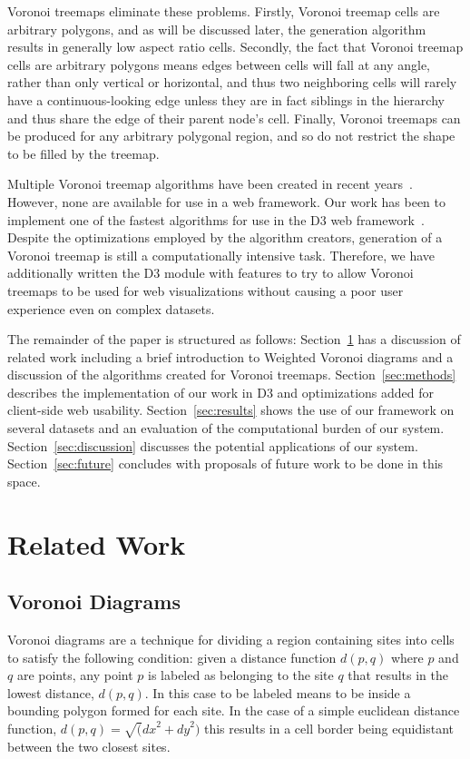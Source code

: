 \documentclass{acm_proc_article-sp}
\begin{document}
Voronoi treemaps eliminate these problems. Firstly, Voronoi treemap
cells are arbitrary polygons, and as will be discussed later, the
generation algorithm results in generally low aspect ratio
cells. Secondly, the fact that Voronoi treemap cells are arbitrary
polygons means edges between cells will fall at any angle, rather than
only vertical or horizontal, and thus two neighboring cells will
rarely have a continuous-looking edge unless they are in fact
siblings in the hierarchy and thus share the edge of their parent
node's cell. Finally, Voronoi treemaps can be produced for any
arbitrary polygonal region, and so do not restrict the shape to be
filled by the treemap.

Multiple Voronoi treemap algorithms have been created in recent 
years~\cite{balzer:treemaps, sud:fast, nocaj:faster}. However,
none are available for use in a web framework.  Our work has been to
implement one of the fastest algorithms for use in the D3 web
framework~\cite{cite D3}. Despite the optimizations employed by the algorithm
creators, generation of a Voronoi treemap is still a computationally
intensive task. Therefore, we have additionally written the D3 module
with features to try to allow Voronoi treemaps to be used for web
visualizations without causing a poor user experience even on complex
datasets.

The remainder of the paper is structured as follows: Section~\ref{sec:related} has a
discussion of related work including a brief introduction to Weighted
Voronoi diagrams and a discussion of the algorithms created for
Voronoi treemaps. Section~\ref{sec:methods} describes the implementation of our work
in D3 and optimizations added for client-side web usability. Section~\ref{sec:results}
shows the use of our framework on several datasets and an evaluation
of the computational burden of our system. Section~\ref{sec:discussion} discusses the
potential applications of our system. Section~\ref{sec:future} concludes with
proposals of future work to be done in this space.

\section{Related Work}
\label{sec:related}

\subsection{Voronoi Diagrams}
Voronoi diagrams are a technique for dividing a region containing
sites into cells to satisfy the following condition: given a distance
function $d(p, q)$ where $p$ and $q$ are points, any point $p$ is
labeled as belonging to the site $q$ that results in the lowest
distance, $d(p,q)$. In this case to be labeled means to be inside a
bounding polygon formed for each site. In the case of a simple
euclidean distance function, $d(p,q) = \sqrt({dx}^2 + {dy}^2)$ this
results in a cell border being equidistant between the two closest
sites.
\end{document}
